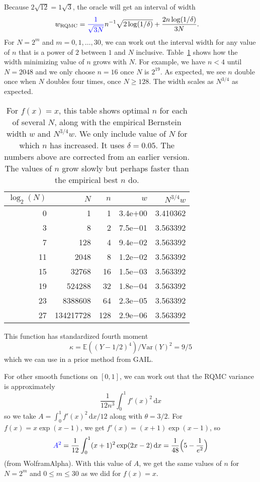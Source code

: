\documentclass{article}
\newcommand{\art}[1]{\begingroup\color{blue}#1\endgroup}
\renewcommand{\le}{\leqslant}
\renewcommand{\ge}{\geqslant}
\newcommand{\e}{\mathbb{E}}
\newcommand{\var}{\mathrm{Var}}
\newcommand{\rqmc}{\mathrm{RQMC}}
\newcommand{\rd}{\,\mathrm{d}}
\begin{document}
\art{Because $2\sqrt{12}=1\sqrt{3}$,} the oracle will get an interval of width
\begin{align*}
w_{\rqmc}&=\art{\frac{1}{\sqrt{3N}}}n^{-1}\sqrt{2\log(1/\delta)}  + \frac{2n\log(1/\delta)}{3N}.
\end{align*}
For $N = 2^m$ and $m=0,1,\dots,30$, we can work out the
interval width for any value of $n$ that is a power of $2$
between $1$ and $N$ inclusive. Table~\ref{tab:forx} shows
how the width minimizing value of $n$ grows with $N$.
For example, we have $n<4$ until $N=2048$ and we only choose
$n=16$ once $N$ is $2^{19}$.  As expected, we see $n$ double
once when $N$ doubles four times, once $N\ge128$. The width scales as $N^{3/4}$
as expected.

\begin{table}\centering
\begin{tabular}{rrrrr}
\toprule
$\log_2(N)$&         $N$ & $n$    &    $w$ &$N^{3/4}w$\\
\midrule 
 0&         1 &  1 &3.4e$+$00  &3.410362\\
 3&         8 &  2& 7.5e$-$01  &3.563392\\
 7&       128 &  4& 9.4e$-$02  &3.563392\\
11&      2048 &  8& 1.2e$-$02  &3.563392\\
15&     32768 & 16& 1.5e$-$03  &3.563392\\
19&    524288 & 32& 1.8e$-$04  &3.563392\\
23&   8388608 & 64& 2.3e$-$05  &3.563392\\
27& 134217728 &128& 2.9e$-$06  &3.563392\\
\bottomrule
\end{tabular}
\caption{\label{tab:forx} For $f(x)=x$, this table shows optimal
$n$ for each of several $N$, along with the empirical Bernstein
width $w$ and $N^{3/4}w$. We only include value of $N$ for which
$n$ has increased. It uses $\delta = 0.05$.
\art{The numbers above are corrected from an earlier version. The values of $n$ grow slowly but perhaps faster than the empirical best $n$ do.}
}
\end{table}



This function has standardized fourth moment
$$
\kappa = \e((Y-1/2)^4)/\var(Y)^2 = 9/5
$$
which we can use in a prior method from GAIL.

For other smooth functions on $[0,1]$, we can work out that
the RQMC variance is approximately
$$
\frac1{12n^3}\int_0^1 f'(x)^2\rd x
$$
so we take $A = \int_0^1f'(x)^2\rd x/12$ along with $\theta=3/2$.
For $f(x) = x\exp(x-1)$, we get $f'(x) = (x+1)\exp(x-1)$, so
$$
\art{A^2} =\frac1{12}\int_0^1 (x+1)^2\exp(2x-2)\rd x=\frac1{48}\Bigl(5-\frac{1}{e^2}\Bigr)
$$
(from WolframAlpha). With this value of $A$, we get the same values of $n$ for $N=2^m$ and $0\le m\le 30$ as we did for $f(x)=x$.
\end{document}
